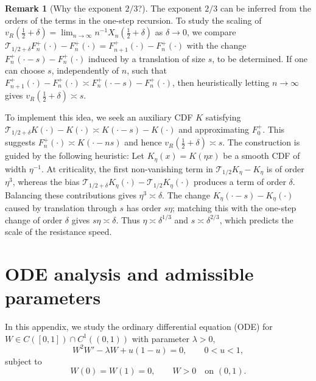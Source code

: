 \documentclass[a4paper,fleqn]{cas-sc}
\newif\ifshowrevisions
\newenvironment{revision}{\begingroup\ifshowrevisions\color{blue}\fi}{\endgroup}
\numberwithin{equation}{section}
\theoremstyle{plain}
\theoremstyle{definition}
\newtheorem{remark}[theorem]{Remark}
\begin{document}
\begin{remark}[Why the exponent $2/3$?]
\label{rem:two-thirds-heuristic}
\begin{revision}
The exponent \(2/3\) can be inferred from the orders of the terms in the one-step recursion. To study the scaling of $v_R(\frac12+\delta)=\lim_{n\to\infty}n^{-1}X_n(\frac12+\delta)$ as $\delta\to0$, we compare
$\mathcal T_{1/2+\delta}F_n^+(\cdot)-F_n^+(\cdot)=F_{n+1}^+(\cdot)-F_n^+(\cdot)$ with the change
$F_n^+(\cdot-s)-F_n^+(\cdot)$ induced by a translation of size $s$, to be determined. If one can choose $s$, independently of $n$, such that
$F_{n+1}^+(\cdot)-F_n^+(\cdot)\asymp F_n^+(\cdot-s)-F_n^+(\cdot)$, then heuristically letting $n\to\infty$ gives $v_R(\frac12+\delta)\asymp s$.

To implement this idea, we seek an auxiliary CDF $K$ satisfying
$\mathcal T_{1/2+\delta}K(\cdot)-K(\cdot)\asymp K(\cdot-s)-K(\cdot)$ and approximating $F_0^+$. This suggests $F_n^+(\cdot)\asymp K(\cdot-ns)$ and hence $v_R(\frac12+\delta)\asymp s$. The construction is guided by the following heuristic:
\end{revision}
Let \(K_\eta(x)=K(\eta x)\) be a smooth CDF of width
\(\eta^{-1}\).  At criticality, the first non-vanishing term in
\(\mathcal T_{1/2}K_\eta-K_\eta\) is of order \(\eta^3\), whereas the  bias
$\mathcal T_{1/2+\delta}K_{\eta}(\cdot)-\mathcal T_{1/2}K_{\eta}(\cdot)$  produces a term of order \(\delta\).
Balancing these contributions gives \(\eta^3\asymp\delta\).  The change \(K_{\eta}(\cdot-s)-K_{\eta}(\cdot)\) caused by translation
through $s$ has order $s\eta$; matching this with the
one-step change of order \(\delta\) gives
\(s\eta\asymp\delta\).  Thus
\(\eta\asymp\delta^{1/3}\) and
\(s\asymp\delta^{2/3}\), which predicts the scale of the resistance speed.


\end{remark}


\appendix
\section{ODE analysis and admissible parameters}
\label{app:ode}
In this appendix, we study the ordinary differential equation (ODE) for \(W\in C([0,1])\cap C^1((0,1))\) with parameter \(\lambda > 0\),
\begin{equation}
 W^2W'-\lambda W+u(1-u)=0,
 \qquad 0<u<1,
 \label{eq:W-ode}
\end{equation}
subject to
\begin{equation}
 W(0)=W(1)=0,
 \qquad W>0\quad\text{on }(0,1).
 \label{eq:W-boundary}
\end{equation}
\end{document}
